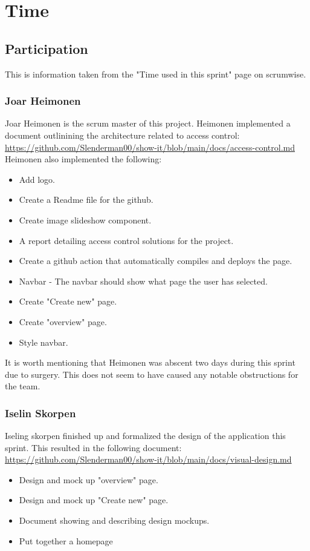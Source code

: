 \documentclass[12pt]{article}
\begin{document}
\section{Time}
\subsection{Participation}
This is information taken from the "Time used in this sprint" page on scrumwise.
\subsubsection{Joar Heimonen}
Joar Heimonen is the scrum master of this project. Heimonen implemented a document outlinining the architecture related to access control:
\url{https://github.com/Slenderman00/show-it/blob/main/docs/access-control.md}
Heimonen also implemented the following:
    \begin{itemize}
        \item Add logo.
        \item Create a Readme file for the github.
        \item Create image slideshow component.
        \item A report detailing access control solutions for the project. \cite{ShowitDocsAccesscontrol}
        \item Create a github action that automatically compiles and deploys the page.
        \item Navbar - The navbar should show what page the user has selected.
        \item Create "Create new" page.
        \item Create "overview" page.
        \item Style navbar.
    \end{itemize}
It is worth mentioning that Heimonen was abscent two days during this sprint due to surgery.
This does not seem to have caused any notable obstructions for the team.

\subsubsection{Iselin Skorpen}
Iseling skorpen finished up and formalized the design of the application this sprint. This resulted in the following document:
\url{https://github.com/Slenderman00/show-it/blob/main/docs/visual-design.md}
    \begin{itemize}
        \item Design and mock up "overview" page.
        \item Design and mock up "Create new" page.
        \item Document showing and describing design mockups. \cite{ShowitDocsVisualdesign}
        \item Put together a homepage
    \end{itemize}
\end{document}
